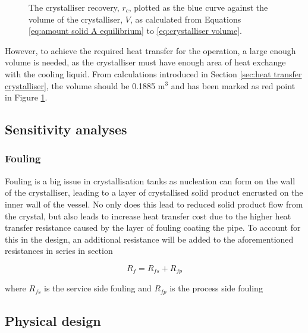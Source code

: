 \begin{figure}[h]
    \centering
    
    \caption{The crystalliser recovery, $r_c$, plotted as the blue curve against the volume of the crystalliser, $V$, as calculated from Equations \ref{eq:amount solid A equilibrium} to \ref{eq:crystalliser volume}. }
    \label{fig:recovery vs volume crystalliser}
\end{figure}

However, to achieve the required heat transfer for the operation, a large enough volume is needed, as the crystalliser must have enough area of heat exchange with the cooling liquid. From calculations introduced in Section \ref{sec:heat transfer crystalliser}, the volume should be 0.1885 m$^3$ and has been marked as red point in Figure \ref{fig:recovery vs volume crystalliser}. 

\subsection{Sensitivity analyses}








\subsubsection{Fouling}

Fouling is a big issue in crystallisation tanks as nucleation can form on the wall of the crystalliser, leading to a layer of crystallised solid product encrusted on the inner wall of the vessel. No only does this lead to reduced solid product flow from the crystal, but also leads to increase heat transfer cost due to the higher heat transfer resistance caused by the layer of fouling coating the pipe. To account for this in the  design, an additional resistance will be added to the aforementioned resistances in series in section %


\begin{equation} \label{eq:fouling}
    R_f = R_{fs} + R_{fp}
    \end{equation}
    
    where $R_{fs}$ is the service side fouling and $R_{fp}$ is the process side fouling 
    


\subsection{Physical design}

